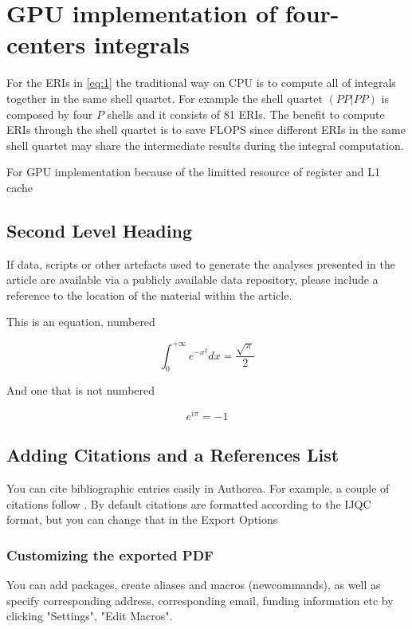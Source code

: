\documentclass[num-refs]{wiley-article}
\begin{document}
\section{GPU implementation of four-centers integrals}

For the ERIs in \ref{eq:1} the traditional way on CPU is to compute all of integrals together in the same shell quartet. For example the shell quartet $(PP|PP)$ is composed by four $P$ shells and it consists of 81 ERIs. The benefit to compute ERIs through the shell quartet is to save FLOPS since different ERIs in the same shell quartet may share the intermediate results during the integral computation. 

For GPU implementation because of the limitted resource of register and L1 cache  


\subsection{Second Level Heading}
If data, scripts or other artefacts used to generate the analyses presented in the article are available via a publicly available data repository, please include a reference to the location of the material within the article.

This is an equation, numbered

\begin{equation}
\label{eqn:some}
\int_0^{+\infty}e^{-x^2}dx=\frac{\sqrt{\pi}}{2}
\end{equation}

And one that is not numbered

\begin{equation*}
e^{i\pi}=-1
\end{equation*}

\subsection{Adding Citations and a References List}

You can cite bibliographic entries easily in Authorea. For example, a couple of citations follow \cite{Cavalleri_2016}. By default citations are formatted according to the IJQC format, but you can change that in the Export Options \cite{Meskine_2019}

\subsubsection{Customizing the exported PDF}
You can add packages, create aliases and macros (newcommands), as well as specify corresponding address, corresponding email, funding information etc by clicking "Settings", "Edit Macros".
\end{document}
